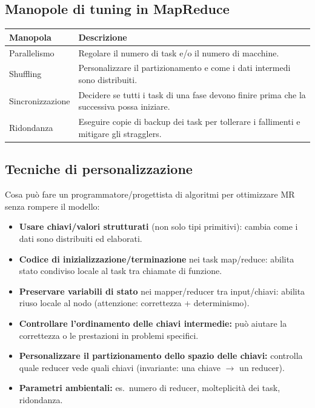 \subsection{Manopole di tuning in MapReduce}

\begin{tabular}{@{}lp{8.5cm}@{}}
  \toprule
  \textbf{Manopola} & \textbf{Descrizione} \\
  \midrule
  Parallelismo    & Regolare il numero di task e/o il numero di macchine. \\
  Shuffling       & Personalizzare il partizionamento e come i dati intermedi
                    sono distribuiti. \\
  Sincronizzazione & Decidere se tutti i task di una fase devono finire prima
                    che la successiva possa iniziare. \\
  Ridondanza      & Eseguire copie di backup dei task per tollerare
                    i fallimenti e mitigare gli stragglers. \\
  \bottomrule
\end{tabular}

\subsection{Tecniche di personalizzazione}

Cosa può fare un programmatore/progettista di algoritmi per ottimizzare MR
senza rompere il modello:
\begin{itemize}
  \item \textbf{Usare chiavi/valori strutturati} (non solo tipi primitivi):
    cambia come i dati sono distribuiti ed elaborati.
  \item \textbf{Codice di inizializzazione/terminazione} nei task map/reduce:
    abilita stato condiviso locale al task tra chiamate di funzione.
  \item \textbf{Preservare variabili di stato} nei mapper/reducer tra
    input/chiavi: abilita riuso locale al nodo (attenzione: correttezza +
    determinismo).
  \item \textbf{Controllare l'ordinamento delle chiavi intermedie:}
    può aiutare la correttezza o le prestazioni in problemi specifici.
  \item \textbf{Personalizzare il partizionamento dello spazio delle chiavi:}
    controlla quale reducer vede quali chiavi (invariante: una chiave
    $\to$ un reducer).
  \item \textbf{Parametri ambientali:} es.\ numero di reducer, molteplicità
    dei task, ridondanza.
\end{itemize}

